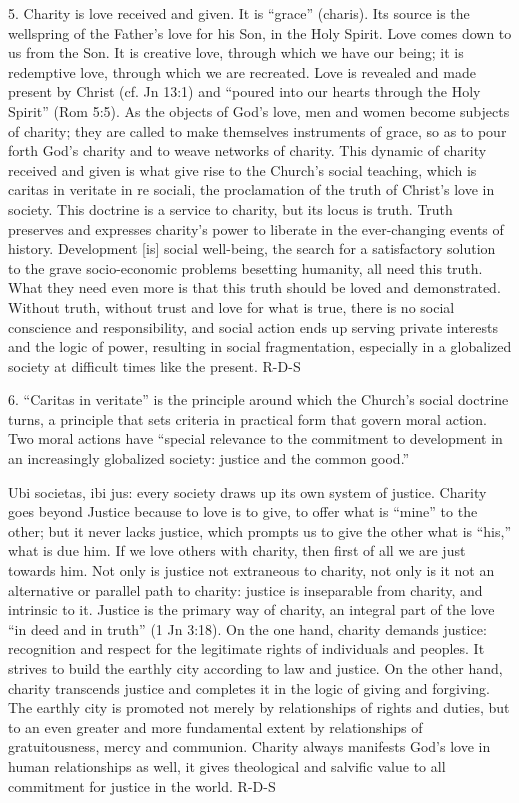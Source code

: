 \documentclass[oneside]{book}
\begin{document}
5. Charity is love received and given. It is ``grace'' (charis). Its source is
the wellspring of the Father's love for his Son, in the Holy Spirit. Love comes
down to us from the Son. It is creative love, through which we have our being;
it is redemptive love, through which we are recreated. Love is revealed and made
present by Christ (cf. Jn 13:1) and ``poured into our hearts through the Holy
Spirit'' (Rom 5:5). As the objects of God's love, men and women become subjects
of charity; they are called to make themselves instruments of grace, so as to
pour forth God's charity and to weave networks of charity. This dynamic of
charity received and given is what give rise to the Church's social teaching,
which is caritas in veritate in re sociali, the proclamation of the truth of
Christ's love in society. This doctrine is a service to charity, but its locus
is truth. Truth preserves and expresses charity's power to liberate in the
ever-changing events of history. Development [is] social well-being, the search
for a satisfactory solution to the grave socio-economic problems besetting
humanity, all need this truth. What they need even more is that this truth
should be loved and demonstrated. Without truth, without trust and love for what
is true, there is no social conscience and responsibility, and social action
ends up serving private interests and the logic of power, resulting in social
fragmentation, especially in a globalized society at difficult times like the
present.
R-D-S

6. ``Caritas in veritate'' is the principle around which the Church's social
doctrine turns, a principle that sets criteria in practical form that govern
moral action. Two moral actions have ``special relevance to the commitment to
development in an increasingly globalized society: justice and the common
good.''

Ubi societas, ibi jus: every society draws up its own system of justice. Charity
goes beyond Justice because to love is to give, to offer what is ``mine'' to the
other; but it never lacks justice, which prompts us to give the other what is
``his,'' what is due him. If we love others with charity, then first of all we
are just towards him. Not only is justice not extraneous to charity, not only is
it not an alternative or parallel path to charity: justice is inseparable from
charity, and intrinsic to it. Justice is the primary way of charity, an integral
part of the love ``in deed and in truth'' (1 Jn 3:18). On the one hand, charity
demands justice: recognition and respect for the legitimate rights of
individuals and peoples. It strives to build the earthly city according to law
and justice. On the other hand, charity transcends justice and completes it in
the logic of giving and forgiving. The earthly city is promoted not merely by
relationships of rights and duties, but to an even greater and more fundamental
extent by relationships of gratuitousness, mercy and communion. Charity always
manifests God's love in human relationships as well, it gives theological and
salvific value to all commitment for justice in the world.
R-D-S
\end{document}
